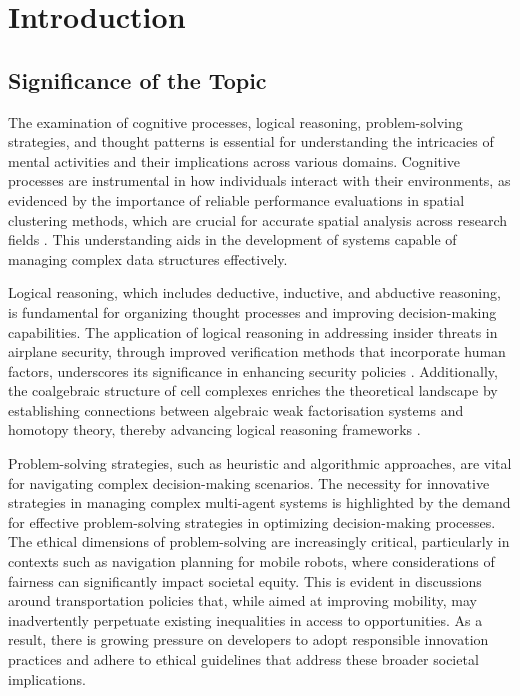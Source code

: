 \section{Introduction} \label{sec:Introduction}


\subsection{Significance of the Topic} \label{subsec:Significance of the Topic}



The examination of cognitive processes, logical reasoning, problem-solving strategies, and thought patterns is essential for understanding the intricacies of mental activities and their implications across various domains. Cognitive processes are instrumental in how individuals interact with their environments, as evidenced by the importance of reliable performance evaluations in spatial clustering methods, which are crucial for accurate spatial analysis across research fields \cite{vidanapathirana2022clusterdetectioncapabilitiesaverage}. This understanding aids in the development of systems capable of managing complex data structures effectively.



Logical reasoning, which includes deductive, inductive, and abductive reasoning, is fundamental for organizing thought processes and improving decision-making capabilities. The application of logical reasoning in addressing insider threats in airplane security, through improved verification methods that incorporate human factors, underscores its significance in enhancing security policies \cite{kammller2020applyingisabelleinsiderframework}. Additionally, the coalgebraic structure of cell complexes enriches the theoretical landscape by establishing connections between algebraic weak factorisation systems and homotopy theory, thereby advancing logical reasoning frameworks \cite{athorne2013coalgebraicstructurecellcomplexes}.



Problem-solving strategies, such as heuristic and algorithmic approaches, are vital for navigating complex decision-making scenarios. The necessity for innovative strategies in managing complex multi-agent systems is highlighted by the demand for effective problem-solving strategies in optimizing decision-making processes. The ethical dimensions of problem-solving are increasingly critical, particularly in contexts such as navigation planning for mobile robots, where considerations of fairness can significantly impact societal equity. This is evident in discussions around transportation policies that, while aimed at improving mobility, may inadvertently perpetuate existing inequalities in access to opportunities. As a result, there is growing pressure on developers to adopt responsible innovation practices and adhere to ethical guidelines that address these broader societal implications. \cite{brandao2020fairnavigationplanninghumanitarian}




